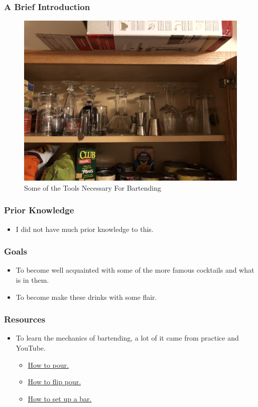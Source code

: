 \documentclass[xclolor=dvipsnames]{beamer}            %
\begin{document}
\begin{darkframes}
    \begin{frame}
        \frametitle{A Brief Introduction}
        \subtitle{Supplies}

        \begin{figure}[H]
            \centering
            \includegraphics[width=.8\linewidth]{assets/tools.jpg}
            \caption{Some of the Tools Necessary For Bartending}
            \label{fig:alcohol}
        \end{figure}
    \end{frame}

    \begin{frame}
        \frametitle{Prior Knowledge}

        \begin{itemize}
            \item I did not have much prior knowledge to this.
        \end{itemize}
    \end{frame}

    \begin{frame}
        \frametitle{Goals}

        \begin{itemize}
            \item To become well acquainted with some of the more famous cocktails and what is in them.
            \item To become make these drinks with some flair.
        \end{itemize}
    \end{frame}

    \begin{frame}
        \frametitle{Resources}

        \begin{itemize}
            \item To learn the mechanics of bartending, a lot of it came from practice and YouTube.
                \begin{itemize}
                    \item \href{https://www.youtube.com/watch?v=adlWwvHtGVA}{How to pour.}
                    \item \href{https://www.youtube.com/watch?v=mNYxSepBHJs}{How to flip pour.}
                    \item \href{https://www.youtube.com/watch?v=s4weXtuax8Q}{How to set up a bar.}
                \end{itemize}


\end{itemize}
\end{frame}
\end{darkframes}
\end{document}
